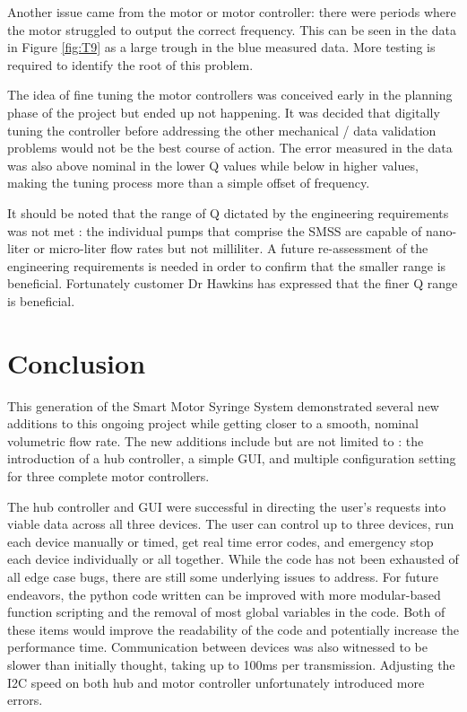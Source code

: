 \documentclass[journal]{IEEEtran}
\begin{document}
        Another issue came from the motor or motor controller: there were periods where the motor struggled to output the correct frequency. This can be seen in the data in Figure \ref{fig:T9} as a large trough in the blue measured data. More testing is required to identify the root of this problem. 
        
        The idea of fine tuning the motor controllers was conceived early in the planning phase of the project but ended up not happening. It was decided that digitally tuning the controller before addressing the other mechanical / data validation problems would not be the best course of action. The error measured in the data was also above nominal in the lower Q values while below in higher values, making the tuning process more than a simple offset of frequency. 
        
        It should be noted that the range of Q dictated by the engineering requirements was not met : the individual pumps that comprise the SMSS are capable of nano-liter or micro-liter flow rates but not milliliter. A future re-assessment of the engineering requirements is needed in order to confirm that the smaller range is beneficial. Fortunately customer Dr Hawkins has expressed that the finer Q range is beneficial.

\section{Conclusion}

    This generation of the Smart Motor Syringe System demonstrated several new additions to this ongoing project while getting closer to a smooth, nominal volumetric flow rate. The new additions include but are not limited to : the introduction of a hub controller, a simple GUI, and multiple configuration setting for three complete motor controllers. 
    
    The hub controller and GUI were successful in directing the user's requests into viable data across all three devices. The user can control up to three devices, run each device manually or timed, get real time error codes, and emergency stop each device individually or all together. While the code has not been exhausted of all edge case bugs, there are still some underlying issues to address. For future endeavors, the python code written can be improved with more modular-based function scripting and the removal of most global variables in the code. Both of these items would improve the readability of the code and potentially increase the performance time. Communication between devices was also witnessed to be slower than initially thought, taking up to 100ms per transmission. Adjusting the I2C speed on both hub and motor controller unfortunately introduced more errors.
    
\end{document}

